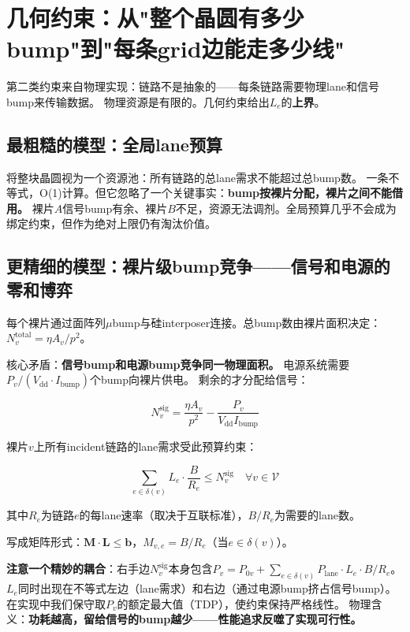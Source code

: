 \section{几何约束：从"整个晶圆有多少bump"到"每条grid边能走多少线"}

第二类约束来自物理实现：链路不是抽象的——每条链路需要物理lane和信号bump来传输数据。
物理资源是有限的。几何约束给出$L_e$的\textbf{上界}。

\subsection{最粗糙的模型：全局lane预算}

将整块晶圆视为一个资源池：所有链路的总lane需求不能超过总bump数。
一条不等式，O(1)计算。但它忽略了一个关键事实：\textbf{bump按裸片分配，裸片之间不能借用。}
裸片$A$信号bump有余、裸片$B$不足，资源无法调剂。全局预算几乎不会成为绑定约束，但作为绝对上限仍有淘汰价值。

\subsection{更精细的模型：裸片级bump竞争——信号和电源的零和博弈}

每个裸片通过面阵列$\mu$bump与硅interposer连接。总bump数由裸片面积决定：$N_v^{\text{total}} = \eta A_v / p^2$。

核心矛盾：\textbf{信号bump和电源bump竞争同一物理面积。}
电源系统需要$P_v / (V_{\text{dd}} \cdot I_{\text{bump}})$个bump向裸片供电。
剩余的才分配给信号：

\begin{equation}\label{eq:bump-budget}
    N_v^{\text{sig}} = \frac{\eta A_v}{p^2} - \frac{P_v}{V_{\text{dd}} I_{\text{bump}}}
\end{equation}

裸片$v$上所有incident链路的lane需求受此预算约束：

\begin{equation}\label{eq:geom-per-die}
    \sum_{e \in \delta(v)} L_e \cdot \frac{B}{R_e} \le N_v^{\text{sig}} \quad \forall v \in \mathcal{V}
\end{equation}

其中$R_e$为链路$e$的每lane速率（取决于互联标准），$B/R_e$为需要的lane数。

写成矩阵形式：$\mathbf{M} \cdot \mathbf{L} \le \mathbf{b}$，$M_{v,e} = B/R_e$（当$e \in \delta(v)$）。

\textbf{注意一个精妙的耦合}：右手边$N_v^{\text{sig}}$本身包含$P_v = P_{0v} + \sum_{e \in \delta(v)} P_{\text{lane}} \cdot L_e \cdot B/R_e$。
$L_e$同时出现在不等式左边（lane需求）和右边（通过电源bump挤占信号bump）。
在实现中我们保守取$P_v$的额定最大值（TDP），使约束保持严格线性。
物理含义：\textbf{功耗越高，留给信号的bump越少——性能追求反噬了实现可行性。}


